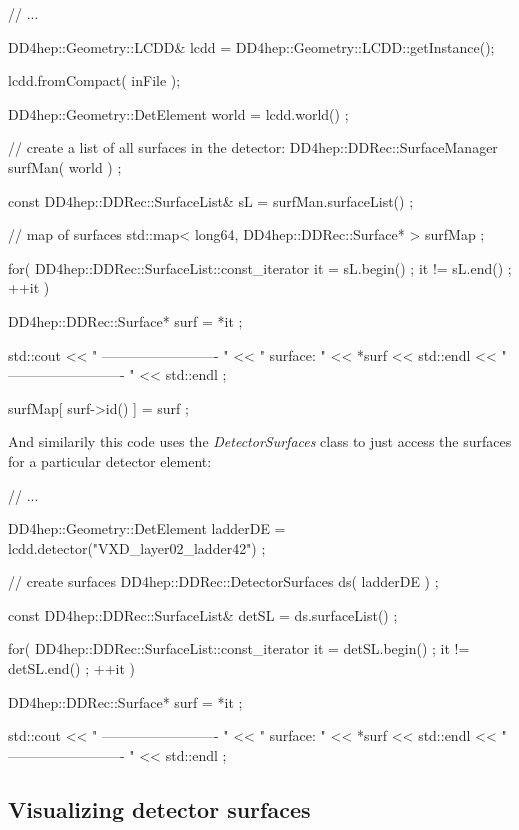 \documentclass[10pt,a4paper]{article}
\begin{document}
\begin{code}
  // ...

  DD4hep::Geometry::LCDD& lcdd = DD4hep::Geometry::LCDD::getInstance();

  lcdd.fromCompact( inFile );

  DD4hep::Geometry::DetElement world = lcdd.world() ;

  // create a list of all surfaces in the detector:
  DD4hep::DDRec::SurfaceManager surfMan(  world ) ;

  const DD4hep::DDRec::SurfaceList& sL = surfMan.surfaceList() ;

  // map of surfaces
  std::map< long64, DD4hep::DDRec::Surface* > surfMap ;

  for( DD4hep::DDRec::SurfaceList::const_iterator it = sL.begin() ; it != sL.end() ; ++it ){
    
    DD4hep::DDRec::Surface* surf =  *it ;
    
    std::cout << " ------------------------- " 
      	      << " surface: "  << *surf         << std::endl
      	      << " ------------------------- "  << std::endl ;
    
    surfMap[ surf->id() ] = surf ;
  }

\end{code}

\noindent
And similarily this code uses the {\em DetectorSurfaces} class to just access the surfaces 
for a particular detector element:

\begin{code}
  // ...

  DD4hep::Geometry::DetElement ladderDE = lcdd.detector("VXD_layer02_ladder42") ;

  // create surfaces
  DD4hep::DDRec::DetectorSurfaces ds( ladderDE ) ;

  const DD4hep::DDRec::SurfaceList& detSL = ds.surfaceList() ;

  for( DD4hep::DDRec::SurfaceList::const_iterator it = detSL.begin() ; it != detSL.end() ; ++it ){

    DD4hep::DDRec::Surface* surf =  *it ;

    std::cout << " ------------------------- " 
      	      << " surface: "  << *surf         << std::endl
      	      << " ------------------------- "  << std::endl ;
  }
\end{code}

\subsection{Visualizing detector surfaces}
\label{subsec:ddrec-surfaces-visualization}
\end{document}
